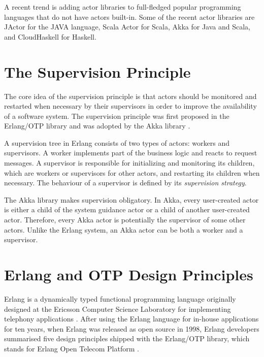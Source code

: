 A recent trend is adding actor libraries to full-fledged popular programming 
languages that do not have actors built-in.  Some of the recent actor libraries 
are JActor  \citep{JActor} for the JAVA language, Scala Actor \citep{actor_1, 
actor_2} for Scala, Akka \citep{akka_doc} for Java and Scala, and CloudHaskell 
\citep{CloudHaskell} for Haskell.


\section{The Supervision Principle}
\label{supervision_principle}

The core idea of the supervision principle is that actors should 
be monitored and restarted when necessary by their supervisors in order to 
improve the availability of a software system.  The supervision principle was 
first proposed in the Erlang/OTP library \citep{OTP} and was adopted by the Akka 
library \citep{akka_doc}.

A supervision tree in Erlang consists of two types of actors: workers and 
supervisors. A worker implements part of the business logic and reacts to 
request messages.  A supervisor is responsible for initializing and monitoring 
its children, which are workers or supervisors for other actors, and restarting 
its children when necessary.  The behaviour of a supervisor is defined by its 
{\it supervision strategy}.

The Akka library makes supervision obligatory.  In Akka, every user-created 
actor is either a child of the system guidance actor or a child of another 
user-created actor.  Therefore, every Akka actor is potentially the supervisor 
of some other actors.  Unlike the Erlang system, an Akka actor can be 
both a worker and a supervisor.





\section{Erlang and OTP Design Principles}
\label{erlang_otp}

Erlang \citep{erlang_history, ArmstrongErlang} is a dynamically typed 
functional programming language originally designed at the Ericsson Computer 
Science Laboratory for implementing telephony applications 
\citep{erlang_history}.  After using the Erlang language for in-house 
applications for ten years, when Erlang was released as open source in 1998, 
Erlang developers summarised five design principles shipped with the Erlang/OTP 
library, which stands for Erlang Open Telecom Platform \citep{erlang_history, 
OTP}.

